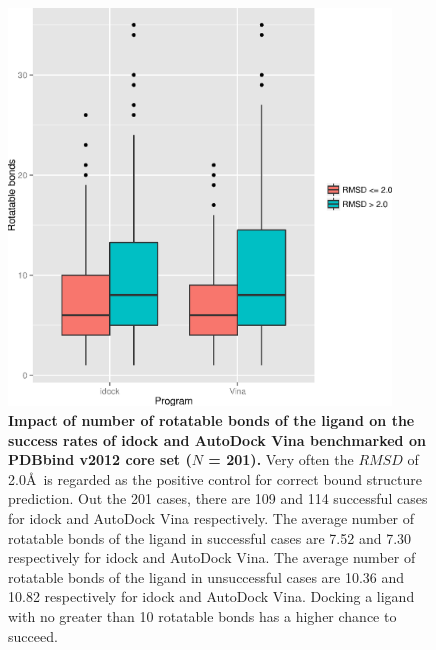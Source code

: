 \documentclass[10pt]{article}
\begin{document}
\begin{figure}[!ht]
\begin{center}
\includegraphics[width=4in]{../istar/Program-NRB.eps}
\end{center}
\caption{
{\bf Impact of number of rotatable bonds of the ligand on the success rates of idock and AutoDock Vina benchmarked on PDBbind v2012 core set ($N$ = 201).} Very often the $RMSD$ of 2.0\AA\ is regarded as the positive control for correct bound structure prediction. Out the 201 cases, there are 109 and 114 successful cases for idock and AutoDock Vina respectively. The average number of rotatable bonds of the ligand in successful cases are 7.52 and 7.30 respectively for idock and AutoDock Vina. The average number of rotatable bonds of the ligand in unsuccessful cases are 10.36 and 10.82 respectively for idock and AutoDock Vina. Docking a ligand with no greater than 10 rotatable bonds has a higher chance to succeed.
}
\label{Program-NRB}
\end{figure}
\end{document}
